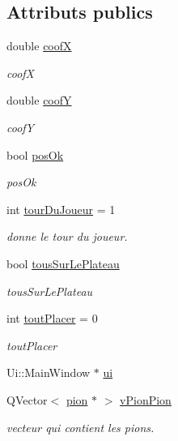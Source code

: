 \subsection*{Attributs publics}
\begin{DoxyCompactItemize}
\item 
double \hyperlink{class_main_window_a86efc7c173a08f153d7c781a9bb7dfe0}{coof\-X}
\begin{DoxyCompactList}\small\item\em coof\-X \end{DoxyCompactList}\item 
double \hyperlink{class_main_window_a2f2474d5ae1f34d4800e8fb67cf609af}{coof\-Y}
\begin{DoxyCompactList}\small\item\em coof\-Y \end{DoxyCompactList}\item 
bool \hyperlink{class_main_window_a7c53199a6fe3faad4ca98a78766a2863}{pos\-Ok}
\begin{DoxyCompactList}\small\item\em pos\-Ok \end{DoxyCompactList}\item 
int \hyperlink{class_main_window_a7b2b2add6bd8d72fb18f0f43c9998cb8}{tour\-Du\-Joueur} = 1
\begin{DoxyCompactList}\small\item\em donne le tour du joueur. \end{DoxyCompactList}\item 
bool \hyperlink{class_main_window_addef95af943f4874df6489bf08f2a516}{tous\-Sur\-Le\-Plateau}
\begin{DoxyCompactList}\small\item\em tous\-Sur\-Le\-Plateau \end{DoxyCompactList}\item 
int \hyperlink{class_main_window_a3356efaa3ec31594ed925406751cb1ab}{tout\-Placer} = 0
\begin{DoxyCompactList}\small\item\em tout\-Placer \end{DoxyCompactList}\item 
Ui\-::\-Main\-Window $\ast$ \hyperlink{class_main_window_a35466a70ed47252a0191168126a352a5}{ui}
\item 
Q\-Vector$<$ \hyperlink{classpion}{pion} $\ast$ $>$ \hyperlink{class_main_window_a972ef4345f96449207b78b25c170e0ba}{v\-Pion\-Pion}
\begin{DoxyCompactList}\small\item\em vecteur qui contient les pions. \end{DoxyCompactList}\item 

\end{DoxyCompactItemize}
